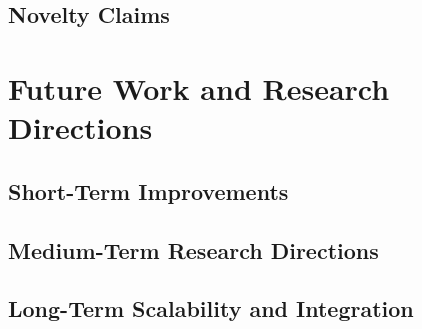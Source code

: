\documentclass[12pt,a4paper]{report}
\begin{document}
  \subsection{Novelty Claims}
  \label{subsec:novelty}

\section{Future Work and Research Directions}
\label{sec:future-work}

  \subsection{Short-Term Improvements}
  \label{subsec:future-short-term}

  \subsection{Medium-Term Research Directions}
  \label{subsec:future-mid-term}

  \subsection{Long-Term Scalability and Integration}
  \label{subsec:future-long-term}
\end{document}
